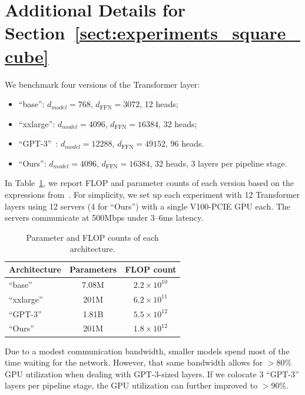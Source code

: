 \section{Additional Details for Section~\ref{sect:experiments_square_cube}}
\label{appendix:detailed_setup}
We benchmark four versions of the Transformer layer:

\begin{itemize}
    \item ``base'': $d_{model} = 768$, $d_{\text{FFN}} = 3072$, 12 heads;
    \item ``xxlarge'': $d_{model} = 4096$, $d_{\text{FFN}} = 16384$, 32 heads;
    \item ``GPT-3''~\citep{gpt3}: $d_{model} = 12288$, $d_{\text{FFN}} = 49152$, 96 heads.
    \item ``Ours'': $d_{model} = 4096$, $d_{\text{FFN}} = 16384$, 32 heads, 3 layers per pipeline stage.
\end{itemize}
\vspace{-4pt}

In Table~\ref{tab:flops_params}, we report FLOP and parameter counts of each version based on the expressions from~\cite{kaplan2020scaling}.
For simplicity, we set up each experiment with 12 Transformer layers using 12 servers (4 for ``Ours'') with a single V100-PCIE GPU each. The servers communicate at 500Mbps under 3--6ms latency. 

\begin{table}[b]
\vspace{-6pt}
\centering
\caption{Parameter and FLOP counts of each architecture.}
\vspace{-4pt}
\label{tab:flops_params}
\begin{tabular}{@{}lcc@{}}
\toprule
Architecture & Parameters & FLOP count \\ \midrule
``base'' & 7.08M & $2.2\times 10^{10}$ \\
``xxlarge'' & 201M & $6.2\times 10^{11}$ \\
``GPT-3'' & 1.81B & $5.5\times 10^{12}$ \\
``Ours'' & 201M & $1.8\times 10^{12}$ \\ \bottomrule
\end{tabular}
\end{table}

Due to a modest communication bandwidth, smaller models spend most of the time waiting for the network. However, that same bandwidth allows for $>80\%$ GPU utilization when dealing with GPT-3-sized layers. If we colocate 3 ``GPT-3'' layers per pipeline stage, the GPU utilization can further improved to $>90\%$.

